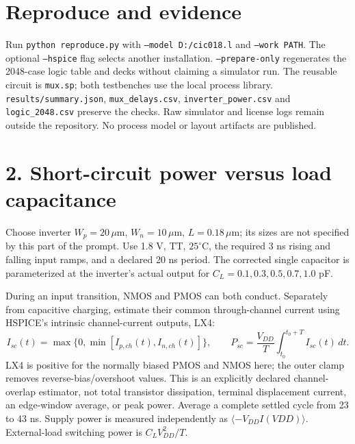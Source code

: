 \documentclass[11pt,a4paper]{article}
\begin{document}
\section*{Reproduce and evidence}
Run \texttt{python reproduce.py} with \texttt{--model D:/cic018.l} and
\texttt{--work PATH}. The optional \texttt{--hspice} flag selects another
installation. \texttt{--prepare-only} regenerates the 2048-case logic table
and decks without claiming a simulator run. The reusable circuit is
\texttt{mux.sp}; both testbenches use the local process library.
\texttt{results/summary.json}, \texttt{mux\_delays.csv},
\texttt{inverter\_power.csv} and \texttt{logic\_2048.csv} preserve the checks.
Raw simulator and license logs remain outside the repository. No process
model or layout artifacts are published.

\newpage\section*{2. Short-circuit power versus load capacitance}
Choose inverter $W_p=20\,\mu$m, $W_n=10\,\mu$m, $L=0.18\,\mu$m; its
sizes are not specified by this part of the prompt. Use 1.8 V, TT, $25^\circ$C,
the required 3 ns rising and falling input ramps, and a declared 20 ns period.
The corrected single capacitor is parameterized at the inverter's actual
output for $C_L=0.1,0.3,0.5,0.7,1.0$ pF.

During an input transition, NMOS and PMOS can both conduct. Separately from
capacitive charging, estimate their common through-channel current using
HSPICE's intrinsic channel-current outputs, LX4:
\[
 I_{sc}(t)=\max\{0,\min[I_{p,ch}(t),I_{n,ch}(t)]\},\qquad
 P_{sc}=\frac{V_{DD}}{T}\int_{t_0}^{t_0+T}I_{sc}(t)\,dt.
\]
LX4 is positive for the normally biased PMOS and NMOS here; the outer clamp
removes reverse-bias/overshoot values. This is an explicitly declared
channel-overlap estimator, not total transistor dissipation, terminal
displacement current, an edge-window average, or peak power. Average a complete
settled cycle from 23 to 43 ns. Supply power is measured independently as
$\langle-V_{DD}I(VDD)\rangle$. External-load switching power is $C_LV_{DD}^2/T$.
\end{document}
